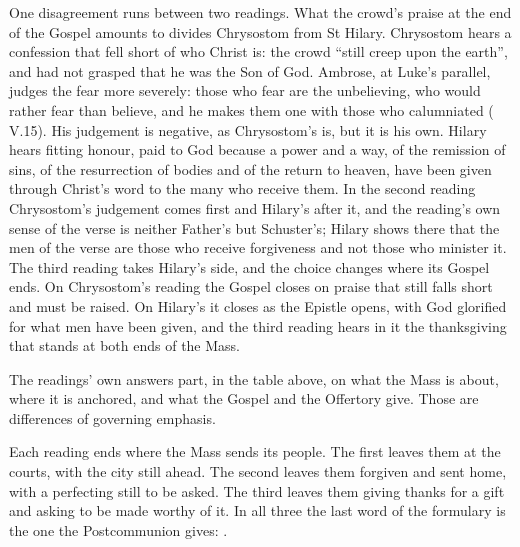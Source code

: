One disagreement runs between two readings. What the crowd's praise at the end
of the Gospel amounts to divides Chrysostom from St Hilary. Chrysostom hears a
confession that fell short of who Christ is: the crowd ``still creep upon the
earth'', and had not grasped that he was the Son of God. Ambrose, at Luke's
parallel, judges the fear more severely: those who fear are the unbelieving,
who would rather fear than believe, and he makes them one with those who
calumniated ( V.15). His judgement is negative, as
Chrysostom's is, but it is his own. Hilary hears fitting
honour, paid to God because a power and a way, of the remission of sins, of the
resurrection of bodies and of the return to heaven, have been given through
Christ's word to the many who receive them. In the second reading
Chrysostom's judgement comes first and Hilary's after it, and the reading's
own sense of the verse is neither Father's but Schuster's; Hilary shows there
that the men of the verse are those who receive forgiveness and not those
who minister it. The third reading takes Hilary's side, and the choice changes
where its Gospel ends. On Chrysostom's reading the Gospel closes on praise that
still falls short and must be raised. On Hilary's it closes as the Epistle
opens, with God glorified for what men have been given, and the third reading
hears in it the thanksgiving that stands at both ends of the Mass.

The readings' own answers part, in the table above, on what the Mass is
about, where it is anchored, and what the Gospel and the Offertory give.
Those are differences of governing emphasis.

Each reading ends where the Mass sends its people. The first leaves them at the
courts, with the city still ahead. The second leaves them forgiven and sent
home, with a perfecting still to be asked. The third leaves them giving thanks
for a gift and asking to be made worthy of it. In all three the last word of the
formulary is the one the Postcommunion gives: .
